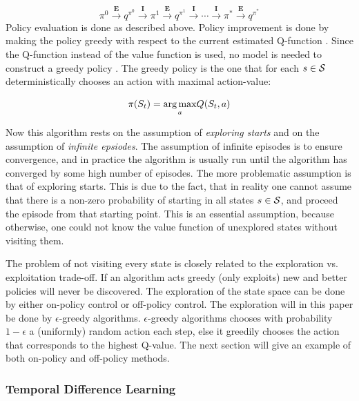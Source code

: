 \begin{equation}
    \label{eq:montecarlocontrol}
    \pi^0 \overset{\textbf{E}}{\longrightarrow}
    q^{\pi^0} \overset{\textbf{I}}{\longrightarrow} \pi^1 \overset{\textbf{E}}{\longrightarrow} q^{\pi^1} \overset{\textbf{I}}{\longrightarrow} \cdots \overset{\textbf{I}}{\longrightarrow} \pi^* \overset{\textbf{E}}{\longrightarrow} q^{\pi^*}
\end{equation}
Policy evaluation is done as described above. Policy improvement is done by making the policy greedy with respect to the current estimated Q-function \parencite{sutton_reinforcement_2018}. Since the Q-function instead of the value function is used, no model is needed to construct a greedy policy \parencite{sutton_reinforcement_2018}. The greedy policy is the one that for each $s \in \mathcal{S}$ deterministically chooses an action with maximal action-value:

\begin{equation}
    \pi(S_t) = \underset{a}{\operatorname*{arg\,max}}  Q( S_t, a )
\end{equation}

Now this algorithm rests on the assumption of \textit{exploring starts} and on the assumption of \textit{infinite epsiodes}. The assumption of infinite episodes is to ensure convergence, and in practice the algorithm is usually run until the algorithm has converged by some high number of episodes. The more problematic assumption is that of exploring starts. This is due to the fact, that in reality one cannot assume that there is a non-zero probability of starting in all states $s \in \mathcal{S}$, and proceed the episode from that starting point. This is an essential assumption, because otherwise, one could not know the value function of unexplored states without visiting them. 

The problem of not visiting every state is closely related to the exploration vs. exploitation trade-off. If an algorithm acts greedy (only exploits) new and better policies will never be discovered. The exploration of the state space can be done by either on-policy control or off-policy control. The exploration will in this paper be done by $\epsilon$-greedy algorithms. $\epsilon$-greedy algorithms chooses with probability $1 - \epsilon$ a (uniformly) random action each step, else it greedily chooses the action that corresponds to the highest Q-value. The next section will give an example of both on-policy and off-policy methods. 

\subsubsection{Temporal Difference Learning}

